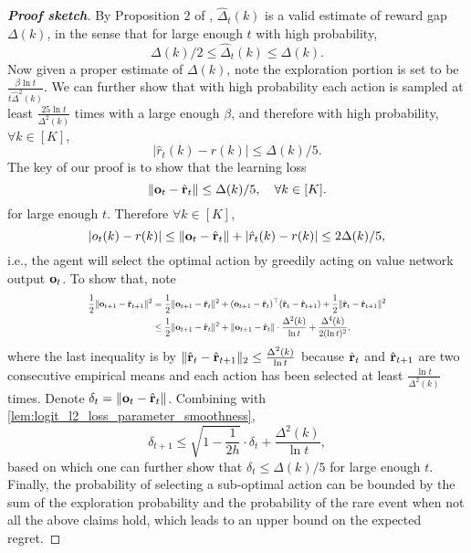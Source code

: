 \begin{proof} [\bf Proof sketch]
		By Proposition 2 of \citet{seldin2017improved}, $\hat{\Delta}_t(k)$ is a valid estimate of reward gap $\Delta(k)$, in the sense that for large enough $t$ with high probability, 
		\begin{equation*}
		    \Delta(k)/2 \le \hat{\Delta}_t(k) \le 	\Delta(k).
		\end{equation*}
		Now given a proper estimate of $\Delta(k)$, note the exploration portion is set to be $\frac{\beta\ln t}{t \hat{\Delta}^2(k)}$.
		We can further show that with high probability each action is sampled at least $\frac{25 \ln t}{\Delta^2(k)}$ times with a large enough $\beta$, and therefore with high probability, $\forall k \in [K]$, 
		\begin{equation*}
		    | \hat{r}_t(k) - r(k) | \le \Delta(k)/5.
		\end{equation*}
		The key of our proof is to show that the learning loss 
		\begin{equation*}
		    \| {\mathbf{o}}_t - \hat{{\mathbf{r}}}_{t}\| \le \Delta(k)/5, \quad \forall k \in [K].
		\end{equation*}
		for large enough $t$. Therefore $\forall k \in [K]$,
		\begin{equation*}
		    | o_t(k) - r(k) | \le \| {\mathbf{o}}_t - \hat{{\mathbf{r}}}_t\| + | \hat{r}_t(k) - r(k) | \le 2\Delta(k)/5,
		\end{equation*}
		i.e., the agent will select the optimal action by greedily acting on value network output ${\mathbf{o}}_t$. To show that, note 
		\begin{equation*}
		\scalemath{0.7}{
		\begin{split}
		\frac{1}{2} \| \rvo_{t+1} - \hat{\rvr}_{t+1}\|^2 &= \frac{1}{2} \| \rvo_{t+1} - \hat{\rvr}_t\|^2 + ( \rvo_{t+1} - \hat{\rvr}_t )^\top ( \hat{\rvr}_t - \hat{\rvr}_{t+1} ) + \frac{1}{2} \| \hat{\rvr}_t - \hat{\rvr}_{t+1} \|^2 \\
		&\le \frac{1}{2} \| \rvo_{t+1} - \hat{\rvr}_t\|^2 + \| \rvo_{t+1} - \hat{\rvr}_t\| \cdot \frac{\Delta^2(k)}{\ln{t}} + \frac{\Delta^4(k)}{2 ( \ln{t} )^2 },
		\end{split}
		}
		\end{equation*}
		where the last inequality is by $\| \hat{{\mathbf{r}}}_t - \hat{{\mathbf{r}}}_{t+1} \|_2 \le \frac{\Delta^2(k)}{\ln{t}}$ because $\hat{{\mathbf{r}}}_t$  and $\hat{{\mathbf{r}}}_{t+1}$ are two consecutive empirical means and each action has been selected at least $\frac{\ln t}{\Delta^2(k)}$ times. Denote $\delta_t = \| {\mathbf{o}}_t - \hat{{\mathbf{r}}}_{t}\|$. Combining with \cref{lem:logit_l2_loss_parameter_smoothness},
		\begin{equation*}
		    \delta_{t+1} \le \sqrt{1 - \frac{1}{2 h} } \cdot \delta_{t} + \frac{\Delta^2(k)}{\ln{t}},
		\end{equation*}
		based on which one can further show that $\delta_t \le \Delta(k) / 5$ for large enough $t$. Finally, the probability of selecting a sub-optimal action can be bounded by the sum of the exploration probability and the probability of the rare event when not all the above claims hold, which leads to an upper bound on the expected regret.
		\end{proof}
